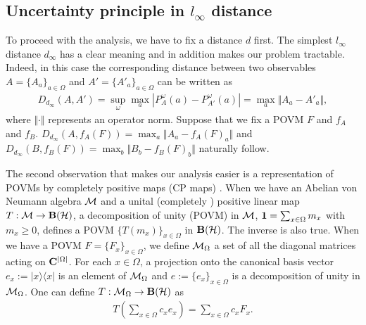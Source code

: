 \documentclass[12pt,showpacs,preprintnumbers,amsmath,amssymb]{revtex4-2}
\begin{document}
 \subsection{Uncertainty principle in $l_{\infty}$ distance}
 To proceed with the analysis, we have to fix a distance $d$ first. 
 The simplest $l_{\infty}$ distance $d_{\infty}$ has a clear 
meaning and in addition makes 
 our problem tractable. Indeed, in this case the corresponding 
 distance between two observables $A=\{A_a\}_{a\in \Omega}$ 
 and $A'=\{A'_a\}_{a\in \Omega}$ 
 can be written as \cite{Heinosaari}
 \begin{eqnarray*}
 D_{d_{\infty}}(A,A')
 =\sup_{\omega} \max_{a} |P^{\omega}_A(a)-
 P^{\omega}_{A'}(a)|
 =\max_a \Vert A_a -A'_a\Vert,
 \end{eqnarray*}
 where $\Vert\cdot \Vert$ represents an operator norm. 
Suppose that we fix a POVM $F$ and $f_A$ and $f_B$. 
$D_{d_{\infty}}(A,f_A(F))
=\max_a \Vert A_a-f_A(F)_a\Vert$ and 
$D_{d_{\infty}}(B,f_B(F))
=\max_b \Vert B_b-f_B(F)_b\Vert$ naturally follow. 
\par
The second observation that makes our analysis easier is a 
representation of POVMs by completely positive maps (CP maps)
\cite{JanssensMaster}. 
When we have an Abelian von Neumann algebra ${\cal M}$ and a 
unital (completely \cite{completely})
 positive linear map $T:{\cal M} \to {\bf B}({\cal H})$, 
a decomposition of unity (POVM) 
in ${\cal M}$, ${\bf 1}=\sum_{x \in \Omega}m_x$ 
with $m_x \geq 0$, defines a POVM $\{T(m_x)\}_{x\in \Omega}$ in
${\bf B}({\cal H})$. 
The inverse is also true. 
When we have a POVM $F=\{F_x\}_{x\in \Omega}$, 
we define ${\cal M}_{\Omega}$ a set of all the diagonal 
matrices acting on ${\bf C}^{|\Omega|}$. 
For each $x\in \Omega$, 
a projection onto the canonical basis vector
$e_x:=|x\rangle \langle x|$ 
is an 
element of ${\cal M}_{\Omega}$ and $e:=\{e_x\}_{x\in \Omega}$ 
is a decomposition of unity in ${\cal M}_{\Omega}$.  
One can define $T:{\cal M}_{\Omega} \to {\bf B}({\cal H})$ 
as 
\begin{eqnarray*}
T(\sum_{x\in \Omega}c_x e_x)
=\sum_{x\in \Omega}c_x F_x.
\end{eqnarray*}
\end{document}
